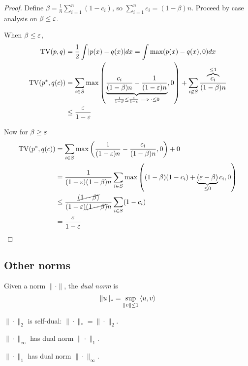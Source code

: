 \begin{proof}
  Define $\beta = \frac{1}{n} \sum_{i=1}^n (1 - c_i)$, so
  $\sum_{i=1}^n c_i = (1 - \beta) n$. Proceed by case analysis
  on $\beta \leq \varepsilon$.

  When $\beta \leq \varepsilon$,
  \begin{align}
    \operatorname{TV}(p, q)
    &= \frac{1}{2} \int \lvert p(x) - q(x) \rvert dx
    = \int \max(p(x) - q(x), 0) dx \\
    \operatorname{TV}(p^*, q(c))
    &= \sum_{i \in S} \max\left(
      \underbrace{\frac{c_i}{(1 - \beta)n} - \frac{1}{(1-\varepsilon)n}}_{
        \frac{1}{1 - \beta} \leq \frac{1}{1 - \varepsilon} \implies \cdot \leq 0
      }, 0
    \right) + \sum_{i \not\in S} \frac{\overbrace{c_i}^{\leq 1}}{(1 - \beta)n} \\
    &\leq \frac{\varepsilon}{1 - \varepsilon}
  \end{align}

  Now for $\beta \geq \varepsilon$
  \begin{align}
    \operatorname{TV}(p^*, q(c))
    &= \sum_{i \in S} \max\left(
      \frac{1}{(1 - \varepsilon)n} - \frac{c_i}{(1 - \beta)n}
      , 0
    \right) + 0 \\
    &= \frac{1}{(1-\varepsilon)(1-\beta)n} \sum_{i \in S} \max\left(
      (1-\beta)(1-c_i)
      + \underbrace{(\varepsilon - \beta)}_{\leq 0} c_i
      , 0
    \right) \\
    &\leq \frac{\cancel{(1-\beta)}}{(1-\varepsilon)\cancel{(1-\beta)} n} \sum_{i \in S} (1 - c_i) \\
    &= \frac{\varepsilon}{1-\varepsilon}
  \end{align}
\end{proof}

\subsection{Other norms}%

\begin{definition}
  Given a norm $\| \cdot \|$, the \emph{dual norm} is
  \begin{align}
    \|u\|_* = \sup_{\|v\| \leq 1} \braket{u,v}
  \end{align}
\end{definition}

\begin{example}
  $\|\cdot\|_2$ is self-dual: $\|\cdot\|_* = \|\cdot\|_2$.

  $\|\cdot\|_\infty$ has dual norm $\|\cdot\|_1$.

  $\|\cdot\|_1$ has dual norm $\|\cdot\|_\infty$.
\end{example}

